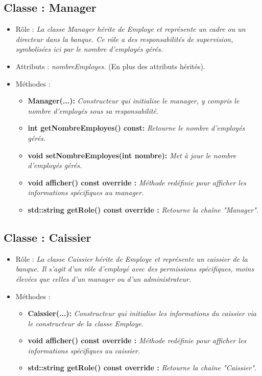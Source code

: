 \subsection{Classe : Manager}
\begin{itemize}[leftmargin=*]
\item Rôle : \textit{La classe Manager hérite de Employe et représente un cadre ou un directeur dans la banque. Ce rôle a des responsabilités de supervision, symbolisées ici par le nombre d'employés gérés.}
\item Attributs : \textit{nombreEmployes.} (En plus des attributs hérités).
\item Méthodes : 
     \begin{itemize}[leftmargin=*]
      \item \textbf{Manager(...):} \textit{Constructeur qui initialise le manager, y compris le nombre d'employés sous sa responsabilité.}
      \item \textbf{int getNombreEmployes() const:} \textit{Retourne le nombre d'employés gérés.}
      \item \textbf{void setNombreEmployes(int nombre):} \textit{Met à jour le nombre d'employés gérés.}
      \item \textbf{void afficher() const override :} \textit{Méthode redéfinie pour afficher les informations spécifiques au manager.}
      \item \textbf{std::string getRole() const override :} \textit{Retourne la chaîne "Manager".}
      \end{itemize}
\end{itemize}

\subsection{Classe : Caissier}
\begin{itemize}[leftmargin=*]
\item Rôle : \textit{La classe Caissier hérite de Employe et représente un caissier de la banque. Il s'agit d'un rôle d'employé avec des permissions spécifiques, moins élevées que celles d'un manager ou d'un administrateur.}
\item Méthodes : 
     \begin{itemize}[leftmargin=*]
      \item \textbf{Caissier(...):} \textit{Constructeur qui initialise les informations du caissier via le constructeur de la classe Employe.}
      \item \textbf{void afficher() const override :} \textit{Méthode redéfinie pour afficher les informations spécifiques au caissier.}
      \item \textbf{std::string getRole() const override :} \textit{Retourne la chaîne "Caissier".}
      \end{itemize}
\end{itemize}

